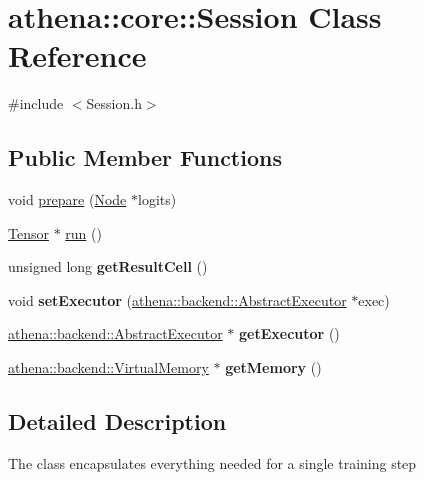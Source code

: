 \hypertarget{classathena_1_1core_1_1_session}{}\section{athena\+:\+:core\+:\+:Session Class Reference}
\label{classathena_1_1core_1_1_session}


{\ttfamily \#include $<$Session.\+h$>$}

\subsection*{Public Member Functions}
\begin{DoxyCompactItemize}
\item 
void \mbox{\hyperlink{classathena_1_1core_1_1_session_a28b51416420aca2c39d9cf7ee81fe41d}{prepare}} (\mbox{\hyperlink{classathena_1_1core_1_1_node}{Node}} $\ast$logits)
\item 
\mbox{\hyperlink{classathena_1_1core_1_1_tensor}{Tensor}} $\ast$ \mbox{\hyperlink{classathena_1_1core_1_1_session_ab08af50ae0bbd2ed5171e1f45a7680ff}{run}} ()
\item 
\mbox{\label{classathena_1_1core_1_1_session_a560fda7749519c69a5cafd889fd4077c}} 
unsigned long {\bfseries get\+Result\+Cell} ()
\item 
\mbox{\label{classathena_1_1core_1_1_session_a8aaab4641be2fe06e2ae098c366375e8}} 
void {\bfseries set\+Executor} (\mbox{\hyperlink{classathena_1_1backend_1_1_abstract_executor}{athena\+::backend\+::\+Abstract\+Executor}} $\ast$exec)
\item 
\mbox{\label{classathena_1_1core_1_1_session_a68b5280e3ce27634acbd0590ed0324ff}} 
\mbox{\hyperlink{classathena_1_1backend_1_1_abstract_executor}{athena\+::backend\+::\+Abstract\+Executor}} $\ast$ {\bfseries get\+Executor} ()
\item 
\mbox{\label{classathena_1_1core_1_1_session_ac9d7ec883d597138673716998180d905}} 
\mbox{\hyperlink{classathena_1_1backend_1_1_virtual_memory}{athena\+::backend\+::\+Virtual\+Memory}} $\ast$ {\bfseries get\+Memory} ()
\end{DoxyCompactItemize}


\subsection{Detailed Description}
The class encapsulates everything needed for a single training step 

